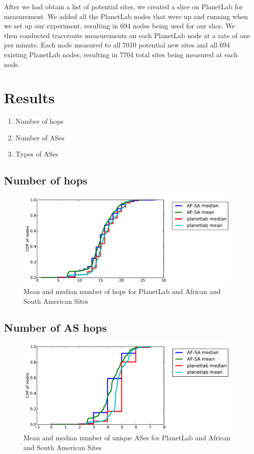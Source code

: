 \documentclass{sig-alternate-10pt}
\begin{document}
After we had obtain a list of potential sites, we created a slice on PlanetLab
for measurement. We added all the PlanetLab nodes that were up and running when
we set up our experiment, resulting in 694 nodes being used for our slice. We
then conducted traceroute measurements on each PlanetLab node at a rate of one
per minute. Each node measured to all 7010 potential new sites and all 694
existing PlanetLab nodes, resulting in 7704 total sites being measured at each
node.


\section{Results}


\begin{enumerate}
\item Number of hops
\item Number of ASes
\item Types of ASes
\end{enumerate}

\subsection{Number of hops}

\begin{figure}
\centering
    \includegraphics[width=1.0\linewidth]{figs/number_of_hops.pdf}
    \caption{Mean and median number of hops for PlanetLab and African
and South American Sites}
\end{figure}

\subsection{Number of AS hops}

\begin{figure}
\centering
    \includegraphics[width=1.0\linewidth]{figs/number_of_ases.pdf}
    \caption{Mean and median number of unique ASes for PlanetLab and African
and South American Sites}
\end{figure}
\end{document}
